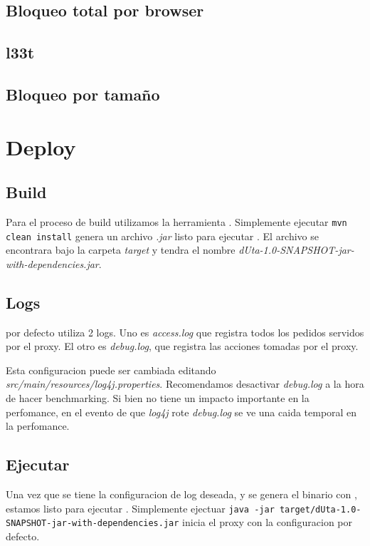 \documentclass[11pt,a4paper,titlepage]{article}
\begin{document}
    \subsection{Bloqueo total por browser}

    \subsection{l33t}

    \subsection{Bloqueo por tamaño}


\section{Deploy}
    \subsection{Build}
    Para el proceso de build utilizamos la herramienta .
    Simplemente ejecutar \texttt{mvn clean install} genera un archivo \textit{.jar} listo para ejecutar \duta.
    El archivo se encontrara bajo la carpeta \textit{target} y tendra el nombre \textit{dUta-1.0-SNAPSHOT-jar-with-dependencies.jar}.

    \subsection{Logs}
    \duta por defecto utiliza 2 logs.
    Uno es \textit{access.log} que registra todos los pedidos servidos por el proxy.
    El otro es \textit{debug.log}, que registra las acciones tomadas por el proxy.

    Esta configuracion puede ser cambiada editando \textit{src/main/resources/log4j.properties}.
    Recomendamos desactivar \textit{debug.log} a la hora de hacer benchmarking.
    Si bien no tiene un impacto importante en la perfomance, en el evento de que \textit{log4j} rote \textit{debug.log} se ve una caida temporal en la perfomance.

    \subsection{Ejecutar \duta}
    Una vez que se tiene la configuracion de log deseada, y se genera el binario con , estamos listo para ejecutar \duta.
    Simplemente ejectuar \texttt{java -jar target/dUta-1.0-SNAPSHOT-jar-with-dependencies.jar} inicia el proxy con la configuracion por defecto.
\end{document}
